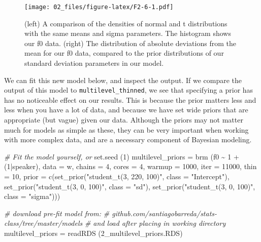 \documentclass[
]{book}
\newenvironment{Shaded}{\begin{snugshade}}{\end{snugshade}}
\newcommand{\AttributeTok}[1]{\textcolor[rgb]{0.77,0.63,0.00}{#1}}
\newcommand{\CommentTok}[1]{\textcolor[rgb]{0.56,0.35,0.01}{\textit{#1}}}
\newcommand{\DecValTok}[1]{\textcolor[rgb]{0.00,0.00,0.81}{#1}}
\newcommand{\FunctionTok}[1]{\textcolor[rgb]{0.00,0.00,0.00}{#1}}
\newcommand{\NormalTok}[1]{#1}
\newcommand{\OtherTok}[1]{\textcolor[rgb]{0.56,0.35,0.01}{#1}}
\newcommand{\SpecialCharTok}[1]{\textcolor[rgb]{0.00,0.00,0.00}{#1}}
\newcommand{\StringTok}[1]{\textcolor[rgb]{0.31,0.60,0.02}{#1}}
\begin{document}
\begin{figure}
\centering
\texttt{[image: 02\_files/figure-latex/F2-6-1.pdf]}
\caption{\label{fig:F2-6}(left) A comparison of the densities of normal and t distributions with the same means and sigma parameters. The histogram shows our f0 data. (right) The distribution of absolute deviations from the mean for our f0 data, compared to the prior distributions of our standard deviation parameters in our model.}
\end{figure}

We can fit this new model below, and inspect the output. If we compare the output of this model to \texttt{multilevel\_thinned}, we see that specifying a prior has has no noticeable effect on our results. This is because the prior matters less and less when you have a lot of data, and because we have set wide priors that are appropriate (but vague) given our data. Although the priors may not matter much for models as simple as these, they can be very important when working with more complex data, and are a necessary component of Bayesian modeling.

\begin{Shaded}
\begin{Highlighting}[]
\CommentTok{\# Fit the model yourself, or}
\FunctionTok{set.seed}\NormalTok{ (}\DecValTok{1}\NormalTok{)}
\NormalTok{multilevel\_priors }\OtherTok{=}  
  \FunctionTok{brm}\NormalTok{ (f0 }\SpecialCharTok{\textasciitilde{}} \DecValTok{1} \SpecialCharTok{+}\NormalTok{ (}\DecValTok{1}\SpecialCharTok{|}\NormalTok{speaker), }\AttributeTok{data =}\NormalTok{ w, }\AttributeTok{chains =} \DecValTok{4}\NormalTok{, }\AttributeTok{cores =} \DecValTok{4}\NormalTok{,}
       \AttributeTok{warmup =} \DecValTok{1000}\NormalTok{, }\AttributeTok{iter =} \DecValTok{11000}\NormalTok{, }\AttributeTok{thin =} \DecValTok{10}\NormalTok{,}
       \AttributeTok{prior =} \FunctionTok{c}\NormalTok{(}\FunctionTok{set\_prior}\NormalTok{(}\StringTok{"student\_t(3, 220, 100)"}\NormalTok{, }\AttributeTok{class =} \StringTok{"Intercept"}\NormalTok{),}
                 \FunctionTok{set\_prior}\NormalTok{(}\StringTok{"student\_t(3, 0, 100)"}\NormalTok{, }\AttributeTok{class =} \StringTok{"sd"}\NormalTok{),}
                 \FunctionTok{set\_prior}\NormalTok{(}\StringTok{"student\_t(3, 0, 100)"}\NormalTok{, }\AttributeTok{class =} \StringTok{"sigma"}\NormalTok{)))}

\CommentTok{\# download pre{-}fit model from: }
\CommentTok{\# github.com/santiagobarreda/stats{-}class/tree/master/models}
\CommentTok{\# and load after placing in working directory}
\NormalTok{multilevel\_priors }\OtherTok{=} \FunctionTok{readRDS}\NormalTok{ (}\StringTok{\textquotesingle{}2\_multilevel\_priors.RDS\textquotesingle{}}\NormalTok{)}
\end{Highlighting}
\end{Shaded}
\end{document}
